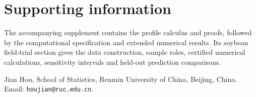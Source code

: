 \section*{Supporting information}
The accompanying supplement contains the profile calculus and proofs, followed by the computational specification and extended numerical results. Its soybean field-trial section gives the data construction, sample roles, certified numerical calculations, sensitivity intervals and held-out prediction comparisons.



\bigskip
\noindent Jian Hou, School of Statistics, Renmin University of China, Beijing, China.
Email: \texttt{houjian@ruc.edu.cn}.


